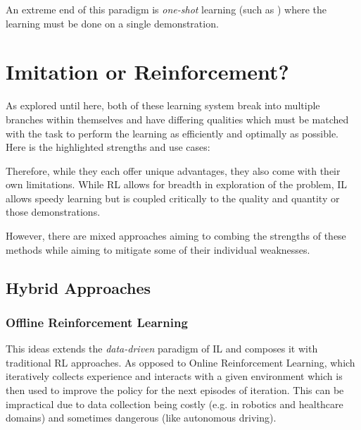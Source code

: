 An extreme end of this paradigm is \emph{one-shot} learning (such as \cite{vitiello2023one}) where the learning must be done on a single demonstration.

\section{Imitation or Reinforcement?}
As explored until here, both of these learning system break into multiple branches within themselves and have differing qualities which must be matched with the task to perform the learning as efficiently and optimally as possible. Here is the highlighted strengths and use cases:


Therefore, while they each offer unique advantages, they also come with their own limitations. While RL allows for breadth in exploration of the problem, IL allows speedy learning but is coupled critically to the quality and quantity or those demonstrations. 

However, there are mixed approaches aiming to combing the strengths of these methods while aiming to mitigate some of their individual weaknesses.

\subsection{Hybrid Approaches}


\subsubsection{Offline Reinforcement Learning}
This ideas extends the \emph{data-driven} paradigm of IL and composes it with traditional RL approaches. As opposed to Online Reinforcement Learning, which iteratively collects experience and interacts with a given environment which is then used to improve the policy for the next episodes of iteration. This can be impractical due to data collection being costly (e.g. in robotics and healthcare domains) and sometimes dangerous (like autonomous driving). 

